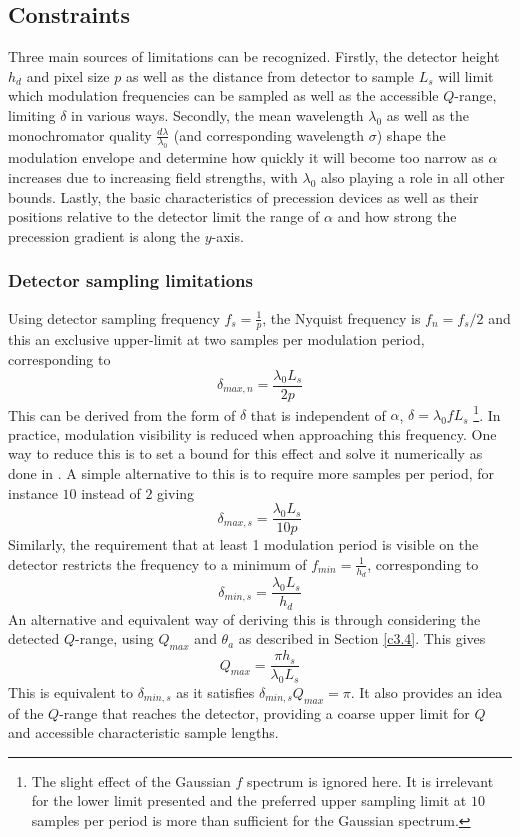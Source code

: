 \documentclass{article}
\begin{document}
\subsection{Constraints}
\label{c4.1}
Three main sources of limitations can be recognized. Firstly, the detector height $h_d$ and pixel size $p$ as well as the distance from detector to sample $L_s$ will limit which modulation frequencies can be sampled as well as the accessible $Q$-range, limiting $\delta$ in various ways.
Secondly, the mean wavelength $\lambda_0$ as well as the monochromator quality $\frac{d\lambda}{\lambda_0}$ (and corresponding wavelength $\sigma$) shape the modulation envelope and determine how quickly it will become too narrow as $\alpha$ increases due to increasing field strengths, with $\lambda_0$ also playing a role in all other bounds. Lastly, the basic characteristics of precession devices as well as their positions relative to the detector limit the range of $\alpha$ and how strong the precession gradient is along the $y$-axis. 

\subsubsection{Detector sampling limitations}
Using detector sampling frequency $f_s = \frac{1}{p}$, the Nyquist frequency is $f_n = f_s/2$ and this an exclusive upper-limit at two samples per modulation period, corresponding to 
$$\delta_{max,n} = \frac{\lambda_0L_s}{2p}$$
This can be derived from the form of $\delta$ that is independent of $\alpha$, $\delta = \lambda_0 fL_s$ \footnote{The slight effect of the Gaussian $f$ spectrum is ignored here. It is irrelevant for the lower limit presented and the preferred upper sampling limit at $10$ samples per period is more than sufficient for the Gaussian spectrum.}. In practice, modulation visibility is reduced when approaching this frequency. One way to reduce this is to set a bound for this effect and solve it numerically as done in \cite{kusmin2017}. A simple alternative to this is to require more samples per period, for instance $10$ instead of $2$ giving
$$\delta_{max,s} = \frac{\lambda_0L_s}{10p}$$
Similarly, the requirement that at least 1 modulation period is visible on the detector restricts the frequency to a minimum of $f_{min} = \frac{1}{h_d}$, corresponding to 
$$\delta_{min,s} = \frac{\lambda_0L_s}{h_d}$$
An alternative and equivalent way of deriving this is through considering the detected $Q$-range, using $Q_{max}$ and $\theta_a$ as described in Section \ref{c3.4}. This gives 
$$Q_{max} = \frac{\pi h_s}{\lambda_0 L_s}$$
This is equivalent to $\delta_{min,s}$ as it satisfies $\delta_{min,s} Q_{max} = \pi$. It also provides an idea of the $Q$-range that reaches the detector, providing a coarse upper limit for $Q$ and accessible characteristic sample lengths. 
\end{document}

